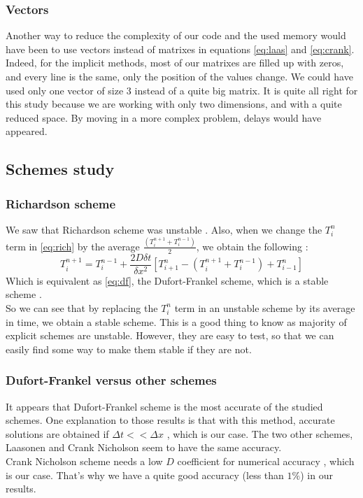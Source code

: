\documentclass{article}
\begin{document}
                \subsubsection{Vectors}
                    Another way to reduce the complexity of our code and the used memory would have been to use vectors instead
                    of matrixes in equations \eqref{eq:laas} and \eqref{eq:crank}. Indeed, for the implicit methods, most of our matrixes are filled up with zeros, and every line is
                    the same, only the position of the values change. We could have used only one vector of size 3 instead of a quite big matrix.
                    It is quite all right for this study because we are working with only two dimensions, and with a quite reduced space.
                    By moving in a more complex problem, delays would have appeared.
            \subsection{Schemes study}
                \subsubsection{Richardson scheme}
                    We saw that Richardson scheme was unstable \cite{rich}. Also, when we change the $T_{i}^n$ term
                    in \eqref{eq:rich} by the average $\frac{(T_i^{n+1}+T_i^{n-1})}{2}$, we obtain the following :
                    \begin{equation}
                        T_i^{n+1} = T_i^{n-1} + \frac{2D\delta t}{\delta x^2}[T_{i+1}^n - (T_i^{n+1}+T_i^{n-1}) + T_{i-1}^n]
                    \end{equation}
                    Which is equivalent as \eqref{eq:df}, the Dufort-Frankel scheme, which is a stable scheme \cite{df}.
                    \\
                    So we can see that by replacing the $T_{i}^n$ term in an unstable scheme by its average in time, we obtain 
                    a stable scheme. This is a good thing to know as majority of explicit schemes are unstable. However, they are
                    easy to test, so that we can easily find some way to make them stable if they are not.
                \subsubsection{Dufort-Frankel versus other schemes}
                    It appears that Dufort-Frankel scheme is the most accurate of the studied schemes. One explanation to those
                    results is that with this method, accurate solutions are obtained if $\Delta t << \Delta x$ \cite{df}, which
                    is our case.
                    The two other schemes, Laasonen and Crank Nicholson seem to have the same accuracy.
                    \\
                    Crank Nicholson scheme needs a low $D$ coefficient for numerical accuracy \cite{crank}, which is our case. That's why 
                    we have a quite good accuracy (less than $1\%$) in our results.
                
\end{document}
